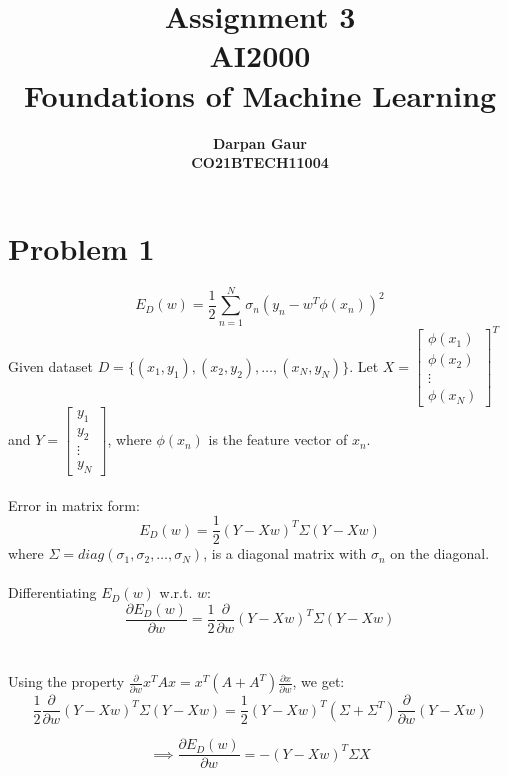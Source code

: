 \documentclass[12pt]{article}
\title{
    \textbf{Assignment 3} \\ 
    \textbf{AI2000} \\
    \textbf{Foundations of Machine Learning}
}
\author{
    \textbf{Darpan Gaur} \\
    \textbf{CO21BTECH11004}
}
\date{}
\begin{document}
\maketitle

\hrulefill

\section*{Problem 1}
\begin{equation*}
    E_D(w) = \frac{1}{2} \sum_{n=1}^{N} \sigma_n(y_n - w^T \phi(x_n))^2
\end{equation*}
Given dataset $D = \{(x_1, y_1), (x_2, y_2), \ldots, (x_N, y_N)\}$. 
Let $X = \begin{bmatrix} \phi(x_1) \\ \phi(x_2) \\ \vdots \\ \phi(x_N) \end{bmatrix}^T$ and $Y = \begin{bmatrix} y_1 \\ y_2 \\ \vdots \\ y_N \end{bmatrix}$, 
where $\phi(x_n)$ is the feature vector of $x_n$.
\\ \\
Error in matrix form:
\begin{equation*}
    E_D(w) = \frac{1}{2} (Y - Xw)^T \Sigma (Y - Xw)
\end{equation*}
where $\Sigma = diag(\sigma_1, \sigma_2, \ldots, \sigma_N)$, is a diagonal matrix with $\sigma_n$ on the diagonal.
\\ \\ 
Differentiating $E_D(w)$ w.r.t. $w$:
\begin{equation*}
    \frac{\partial E_D(w)}{\partial w} = \frac{1}{2} \frac{\partial}{\partial w} (Y - Xw)^T \Sigma (Y - Xw)
\end{equation*}
\\ \\
Using the property $\frac{\partial}{\partial w} x^T A x = x^T (A + A^T) \frac{\partial x}{\partial w}$, we get:
\begin{equation*}
    \frac{1}{2} \frac{\partial}{\partial w} (Y - Xw)^T \Sigma (Y - Xw) = \frac{1}{2} (Y - Xw)^T (\Sigma + \Sigma^T) \frac{\partial}{\partial w} (Y - Xw)
\end{equation*}

\begin{equation*}
    \implies
    \frac{\partial E_D(w)}{\partial w} = -(Y - Xw)^T \Sigma X
\end{equation*}
\end{document}

